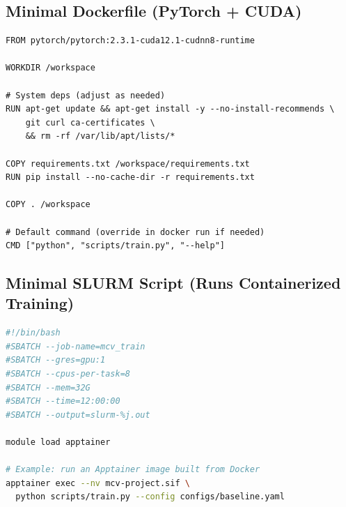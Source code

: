 \documentclass[11pt]{article}
\begin{document}
\subsection{Minimal Dockerfile (PyTorch + CUDA)}
\begin{lstlisting}[language=Docker]
FROM pytorch/pytorch:2.3.1-cuda12.1-cudnn8-runtime

WORKDIR /workspace

# System deps (adjust as needed)
RUN apt-get update && apt-get install -y --no-install-recommends \
    git curl ca-certificates \
    && rm -rf /var/lib/apt/lists/*

COPY requirements.txt /workspace/requirements.txt
RUN pip install --no-cache-dir -r requirements.txt

COPY . /workspace

# Default command (override in docker run if needed)
CMD ["python", "scripts/train.py", "--help"]
\end{lstlisting}

\subsection{Minimal SLURM Script (Runs Containerized Training)}
\begin{lstlisting}[language=bash]
#!/bin/bash
#SBATCH --job-name=mcv_train
#SBATCH --gres=gpu:1
#SBATCH --cpus-per-task=8
#SBATCH --mem=32G
#SBATCH --time=12:00:00
#SBATCH --output=slurm-%j.out

module load apptainer

# Example: run an Apptainer image built from Docker
apptainer exec --nv mcv-project.sif \
  python scripts/train.py --config configs/baseline.yaml
\end{lstlisting}
\end{document}
